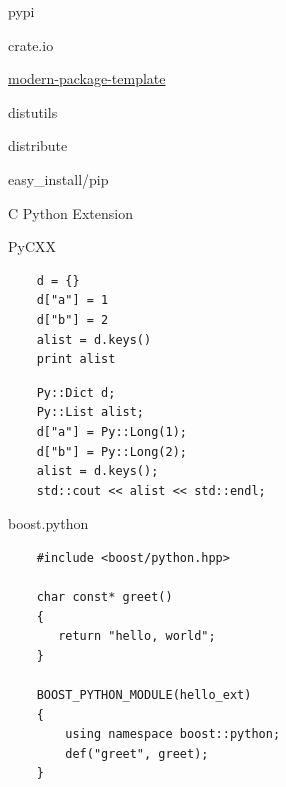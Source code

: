 \documentclass{article}
\begin{document}
\begin{center} pypi \end{center}
crate.io
\newpage

\begin{center} \href{http://pypi.python.org/pypi/modern-package-template/1.0}
                    {modern-package-template} \end{center}

\newpage

\begin{center} distutils \end{center}
\newpage

\begin{center} distribute \end{center}
\newpage 

\begin{center} easy_install/pip \end{center}
\newpage 

\begin{center} C Python Extension \end{center}
\newpage

\begin{center} PyCXX \end{center}
\begin{lstlisting}
    d = {}
    d["a"] = 1
    d["b"] = 2
    alist = d.keys()
    print alist
\end{lstlisting}
\lstset{language=C++}
\begin{lstlisting}
    Py::Dict d;
    Py::List alist;
    d["a"] = Py::Long(1);
    d["b"] = Py::Long(2);
    alist = d.keys();
    std::cout << alist << std::endl;
\end{lstlisting}
\lstset{language=python}
\newpage

\begin{center} boost.python \end{center}
\lstset{language=C++}
\begin{lstlisting}
    #include <boost/python.hpp>

    char const* greet()
    {
       return "hello, world";
    }

    BOOST_PYTHON_MODULE(hello_ext)
    {
        using namespace boost::python;
        def("greet", greet);
    }
\end{lstlisting}
\lstset{language=python}
\newpage
\end{document}
